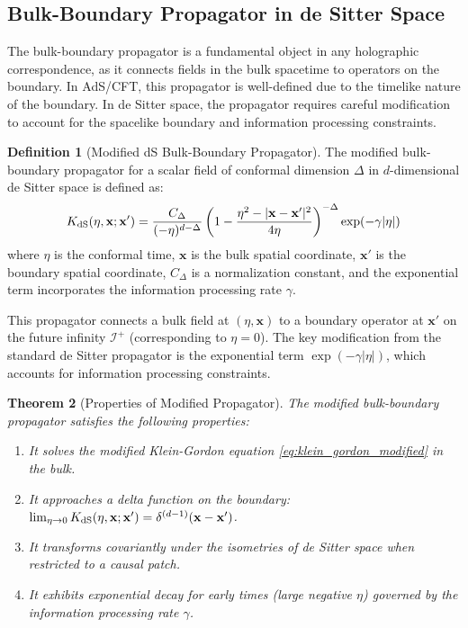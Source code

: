 \documentclass[11pt,english,twoside]{article}
\theoremstyle{plain}
\newtheorem{theorem}{Theorem}[section]
\theoremstyle{definition}
\newtheorem{definition}[theorem]{Definition}
\theoremstyle{remark}
\newcommand{\dS}{{\rm dS}}
\newcommand{\gammaR}{\gamma}
\newcommand{\xb}{\mathbf{x}}
\begin{document}
\subsection{Bulk-Boundary Propagator in de Sitter Space}
\label{subsec:propagator}

The bulk-boundary propagator is a fundamental object in any holographic correspondence, as it connects fields in the bulk spacetime to operators on the boundary. In AdS/CFT, this propagator is well-defined due to the timelike nature of the boundary. In de Sitter space, the propagator requires careful modification to account for the spacelike boundary and information processing constraints.

\begin{definition}[Modified dS Bulk-Boundary Propagator]
\label{def:propagator}
The modified bulk-boundary propagator for a scalar field of conformal dimension $\Delta$ in $d$-dimensional de Sitter space is defined as:
\begin{equation}
\label{eq:propagator}
K_{\dS}(\eta,\xb;\xb') = \frac{C_{\Delta}}{(-\eta)^{d-\Delta}}\left(1 - \frac{\eta^2 - |\xb-\xb'|^2}{4\eta}\right)^{-\Delta} \exp(-\gammaR|\eta|)
\end{equation}
where $\eta$ is the conformal time, $\xb$ is the bulk spatial coordinate, $\xb'$ is the boundary spatial coordinate, $C_{\Delta}$ is a normalization constant, and the exponential term incorporates the information processing rate $\gammaR$.
\end{definition}

This propagator connects a bulk field at $(\eta,\xb)$ to a boundary operator at $\xb'$ on the future infinity $\mathcal{I}^+$ (corresponding to $\eta = 0$). The key modification from the standard de Sitter propagator is the exponential term $\exp(-\gammaR|\eta|)$, which accounts for information processing constraints.

\begin{theorem}[Properties of Modified Propagator]
\label{thm:propagator_properties}
The modified bulk-boundary propagator satisfies the following properties:
\begin{enumerate}
\item It solves the modified Klein-Gordon equation \eqref{eq:klein_gordon_modified} in the bulk.
\item It approaches a delta function on the boundary: $\lim_{\eta \to 0} K_{\dS}(\eta,\xb;\xb') = \delta^{(d-1)}(\xb-\xb')$.
\item It transforms covariantly under the isometries of de Sitter space when restricted to a causal patch.
\item It exhibits exponential decay for early times (large negative $\eta$) governed by the information processing rate $\gammaR$.
\end{enumerate}
\end{theorem}
\end{document}
